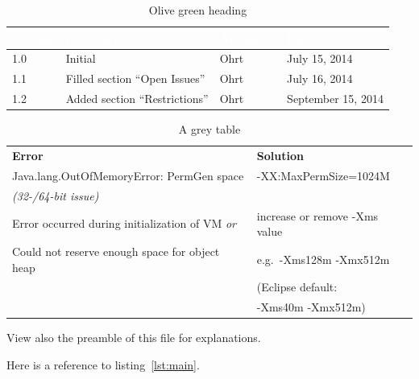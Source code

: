 \begin{center}
\begin{table}[h]
\begin{tabular}{|l|l|l|l|}\hline
\rowcolor{olivegreen30}
\textcolor{white}{\textbf{Version}}		& \textcolor{white}{\textbf{Description}}	
& \textcolor{white}{\textbf{Author(s)}}	& \textcolor{white}{\textbf{Date}}\\\hline
1.0		& Initial							& Ohrt					& July 15, 2014\\\hline
1.1		& Filled section ``Open Issues''		& Ohrt					& July 16, 2014\\\hline
1.2		& Added section ``Restrictions''	& Ohrt					& September 15, 2014\\\hline
\end{tabular}
\caption{Olive green heading} \label{tab:olive}
\end{table}

\begin{table}[h]
\begin{tabular}{ l | l }
\rowcolor{gray20}	\textbf{Error}									& \textbf{Solution} 				\\
\rowcolor{gray5}		Java.lang.OutOfMemoryError: PermGen space 		& -XX:MaxPermSize=1024M 		\\
\rowcolor{gray5}		\textit{(32-/64-bit issue)}							& 								\\
\rowcolor{gray20}	Error occurred during initialization of VM \textit{or}	& increase or remove -Xms value 	\\
\rowcolor{gray20}	Could not reserve enough space for object heap		& e.g.\ -Xms128m -Xmx512m 		\\
\rowcolor{gray20}													& \small{(Eclipse default:}			\\
\rowcolor{gray20}													& \small{-Xms40m -Xmx512m)} 	\\
\end{tabular}
\caption{A grey table} \label{tab:grey}
\end{table}
\end{center}

View also the preamble of this file for explanations.

Here is a reference to listing~\ref{lst:main}.

\chapterend
